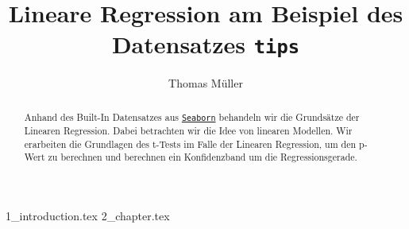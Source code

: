 \documentclass[ngerman]{article}
\title{Lineare Regression am Beispiel des Datensatzes \lstinline[basicstyle=\huge]{tips}}
\author{Thomas Müller}
\date{}
\theoremstyle{definition}
\begin{document}
\parindent 0pt
\parskip 5pt%
{}

\maketitle
\begin{abstract}
    \noindent
    Anhand des Built-In Datensatzes aus \href{https://seaborn.pydata.org}{\lstinline{Seaborn}} behandeln wir die Grundsätze der Linearen Regression.
    Dabei betrachten wir die Idee von linearen Modellen.
    Wir erarbeiten die Grundlagen des t-Tests im Falle der Linearen Regression, um den p-Wert zu berechnen und berechnen ein Konfidenzband um die Regressionsgerade.
\end{abstract}

{1_introduction.tex}
{2_chapter.tex}

\end{document}
